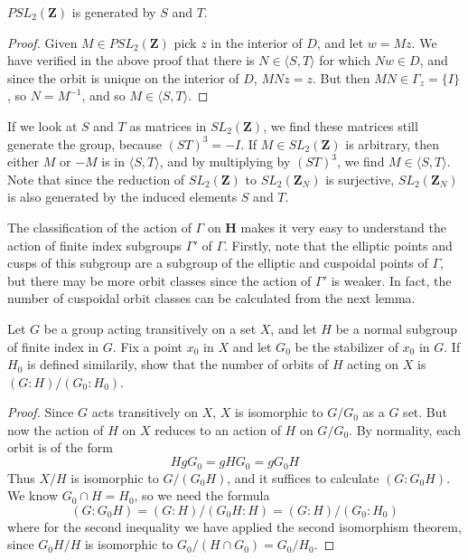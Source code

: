 \begin{corollary}
    $PSL_2(\mathbf{Z})$ is generated by $S$ and $T$.
\end{corollary}
\begin{proof}
    Given $M \in PSL_2(\mathbf{Z})$ pick $z$ in the interior of $D$, and let $w = M z$. We have verified in the above proof that there is $N \in \langle S, T \rangle$ for which $Nw \in D$, and since the orbit is unique on the interior of $D$, $MNz = z$. But then $MN \in \Gamma_z = \{ I \}$, so $N = M^{-1}$, and so $M \in \langle S, T \rangle$.
\end{proof}

\begin{remark}
    If we look at $S$ and $T$ as matrices in $SL_2(\mathbf{Z})$, we find these matrices still generate the group, because $(ST)^3 = -I$. If $M \in SL_2(\mathbf{Z})$ is arbitrary, then either $M$ or $-M$ is in $\langle S ,T \rangle$, and by multiplying by $(ST)^3$, we find $M \in \langle S, T \rangle$. Note that since the reduction of $SL_2(\mathbf{Z})$ to $SL_2(\mathbf{Z}_N)$ is surjective, $SL_2(\mathbf{Z}_N)$ is also generated by the induced elements $S$ and $T$.
\end{remark}

The classification of the action of $\Gamma$ on $\mathbf{H}$ makes it very easy to understand the action of finite index subgroups $\Gamma'$ of $\Gamma$. Firstly, note that the elliptic points and cusps of this subgroup are a subgroup of the elliptic and cuspoidal points of $\Gamma$, but there may be more orbit classes since the action of $\Gamma'$ is weaker. In fact, the number of cuspoidal orbit classes can be calculated from the next lemma.

\begin{lemma}
    Let $G$ be a group acting transitively on a set $X$, and let $H$ be a normal subgroup of finite index in $G$. Fix a point $x_0$ in $X$ and let $G_0$ be the stabilizer of $x_0$ in $G$. If $H_0$ is defined similarily, show that the number of orbits of $H$ acting on $X$ is $(G:H)/(G_0:H_0)$.
\end{lemma}
\begin{proof}
    Since $G$ acts transitively on $X$, $X$ is isomorphic to $G/G_0$ as a $G$ set. But now the action of $H$ on $X$ reduces to an action of $H$ on $G/G_0$. By normality, each orbit is of the form
    \[ HgG_0 = gHG_0 = gG_0H \]
    Thus $X/H$ is isomorphic to $G/(G_0H)$, and it suffices to calculate $(G:G_0H)$. We know $G_0 \cap H = H_0$, so we need the formula
    \[ (G:G_0H) = (G:H)/(G_0H:H) = (G:H)/(G_0:H_0) \]
    where for the second inequality we have applied the second isomorphism theorem, since $G_0H/H$ is isomorphic to $G_0/(H \cap G_0) = G_0/H_0$.
\end{proof}

